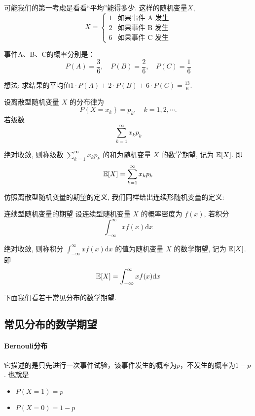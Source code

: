可能我们的第一考虑是看看``平均''能得多少. 这样的随机变量$X$, \[
    X =
    \begin{cases}
    1 & \text{如果事件 A 发生} \\
    2 & \text{如果事件 B 发生} \\
    6 & \text{如果事件 C 发生}
    \end{cases}
    \]
    
    事件A、B、C的概率分别是：
    \[P(A) = \frac{3}{6}, \quad P(B) = \frac{2}{6}, \quad P(C) = \frac{1}{6}\]
    
    想法: 求结果的平均值$1 \cdot P(A) + 2 \cdot P(B) + 6 \cdot P(C)= \frac{13}{6}$.

    \begin{definition}[离散型随机变量的期望]
        设离散型随机变量 $X$ 的分布律为
        $$
        P\left\{X=x_k\right\}=p_k, \quad k=1,2, \cdots .
        $$
        若级数
    $$
    \sum_{k=1}^{\infty} x_k p_k
    $$
    
    绝对收敛, 则称级数 $\sum_{k=1}^{\infty} x_k p_k$ 的和为随机变量 $X$ 的数学期望, 记为 $\mathbb E[X]$. 即
    $$
    \mathbb E[X]=\sum_{k=1}^{\infty} x_k p_k
    $$
    \end{definition}

    
    仿照离散型随机变量的期望的定义, 我们同样给出连续形随机变量的定义:
    \begin{definition}{连续型随机变量的期望}
        设连续型随机变量 $X$ 的概率密度为 $f(x)$, 若积分
$$
\int_{-\infty}^{\infty} x f(x) \mathrm{d} x
$$

绝对收敛, 则称积分 $\int_{-\infty}^{\infty} x f(x) \mathrm{d} x$ 的值为随机变量 $X$ 的数学期望, 记为 $\mathbb E[X]$.即
$$
\mathbb E[X]=\int_{-\infty}^{\infty} x f(x) \mathrm{d} x
$$
    \end{definition}

    下面我们看若干常见分布的数学期望. 

    \subsection{常见分布的数学期望}

    \paragraph{Bernouli分布} 它描述的是只先进行一次事件试验，该事件发生的概率为$p$，不发生的概率为$1-p$. 也就是
    \begin{itemize}
        \item $P(X=1)=p$
        \item $P(X=0)=1-p$
    \end{itemize}

